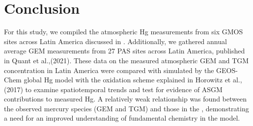 \section{Conclusion}

\begin{flushleft}
For this study, we compiled the atmospheric Hg measurements from six GMOS sites across Latin America discussed in \cite{koenig_seasonal_2021,sprovieri_atmospheric_2016}. Additionally, we gathered annual average GEM measurements from 27 PAS sites across Latin America, published in Quant et al.,(2021). These data on the measured atmospheric GEM and TGM concentration in Latin America were compared with \hgc simulated by the GEOS-Chem global Hg model with the oxidation scheme explained in Horowitz et al.,(2017) to examine spatiotemporal trends and test for evidence of ASGM contributions to measured Hg. A relatively weak relationship was found between the observed mercury species (GEM and TGM) and those in the \on, demonstrating a need for an improved understanding of fundamental chemistry in the \gc model.

\end{flushleft}